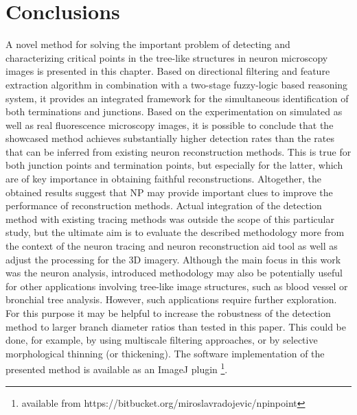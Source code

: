 \section{Conclusions} 
\label{sec:conclusions}
A novel method for solving the important problem of detecting and characterizing critical points in the tree-like structures in neuron microscopy images is presented in this chapter. Based on directional filtering and feature extraction algorithm in combination with a two-stage fuzzy-logic based reasoning system, it provides an integrated framework for the simultaneous identification of both terminations and junctions. Based on the experimentation on simulated as well as real fluorescence microscopy images, it is possible to conclude that the showcased method achieves substantially higher detection rates than the rates that can be inferred from existing neuron reconstruction methods. This is true for both junction points and termination points, but especially for the latter, which are of key importance in obtaining faithful reconstructions. Altogether, the obtained results suggest that NP may provide important clues to improve the performance of reconstruction methods. Actual integration of the detection method with existing tracing methods was outside the scope of this particular study, but the ultimate aim is to evaluate the described methodology more from the context of the neuron tracing and neuron reconstruction aid tool as well as adjust the processing for the 3D imagery. Although the main focus in this work was the neuron analysis, introduced methodology may also be potentially useful for other applications involving tree-like image structures, such as blood vessel or bronchial tree analysis. However, such applications require further exploration. For this purpose it may be helpful to increase the robustness of the detection method to larger branch diameter ratios than tested in this paper. This could be done, for example, by using multiscale filtering approaches, or by selective morphological thinning (or thickening). The software implementation of the presented method is available as an ImageJ plugin \footnote{available from https://bitbucket.org/miroslavradojevic/npinpoint}.





